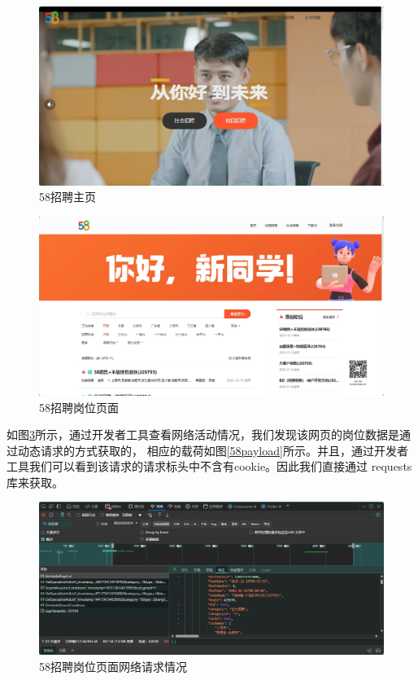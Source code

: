 \begin{figure}[!htbp]
    \centering
    \includegraphics[width=\textwidth]{figures/58.png}
    \caption{58招聘主页}\label{58}
\end{figure}

\begin{figure}[!htbp]
    \centering
    \includegraphics[width=\textwidth]{figures/58job.png}
    \caption{58招聘岗位页面}\label{58job}
\end{figure}

如图\ref{58network}所示，通过开发者工具查看网络活动情况，我们发现该网页的岗位数据是通过动态请求的方式获取的，
相应的载荷如图\ref{58payload}所示。并且，通过开发者工具我们可以看到该请求的请求标头中不含有cookie。因此我们直接通过
requests库来获取。

\begin{figure}[!htbp]
    \centering
    \includegraphics[width=\textwidth]{figures/58network.png}
    \caption{58招聘岗位页面网络请求情况}\label{58network}
\end{figure}

